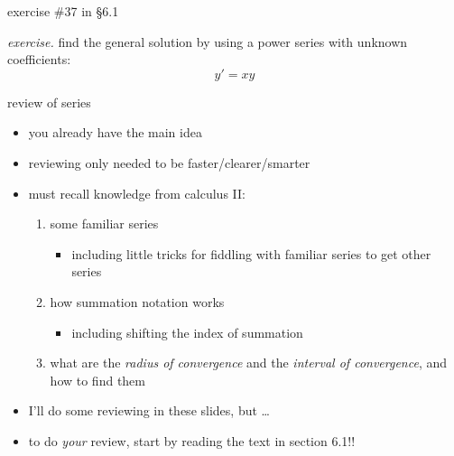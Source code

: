 \documentclass[urlcolor=blue,dvipsnames]{beamer}
\begin{document}
\begin{frame}{exercise \#37 in \S 6.1}

\noindent \emph{exercise.}  find the general solution by using a power series with unknown coefficients:
    $$y'=xy$$

\vspace{70mm}
\end{frame}


\begin{frame}{review of series}

\begin{itemize}
\item you already have the main idea
\item reviewing only needed to be faster/clearer/smarter
\item must recall knowledge from calculus II:

    \begin{enumerate}
    \item some familiar series
        \begin{itemize}
        \item including little tricks for fiddling with familiar series to get other series
        \end{itemize}
    \item how summation notation works
        \begin{itemize}
        \item including shifting the index of summation
        \end{itemize}
    \item what are the \emph{radius of convergence} and the \emph{interval of convergence}, and how to find them
    \end{enumerate}

\bigskip
\item I'll do some reviewing in these slides, but \dots
\item to do \emph{your} review, start by \alert{reading the text in section 6.1}!!
\end{itemize}
\end{frame}
\end{document}
